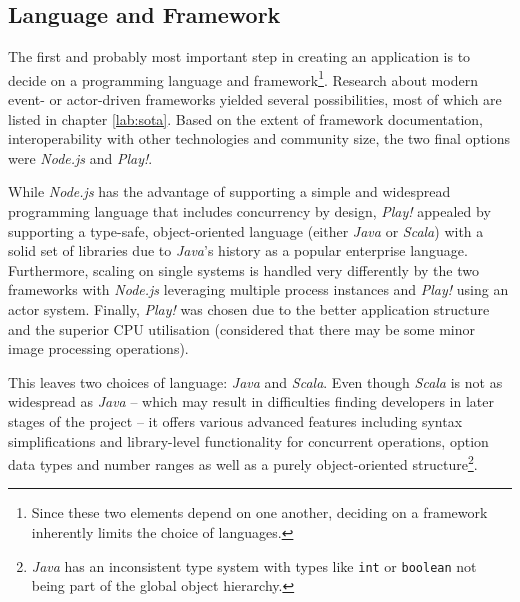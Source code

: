 \subsection{Language and Framework}
\label{lab:lang}
The first and probably most important step in creating an application is to decide on a programming language and framework\footnote{Since these two elements depend on one another, deciding on a framework inherently limits the choice of languages.}. Research about modern event- or actor-driven frameworks yielded several possibilities, most of which are listed in chapter \ref{lab:sota}. Based on the extent of framework documentation, interoperability with other technologies and community size, the two final options were \textit{Node.js} and \textit{Play!}. 

While \textit{Node.js} has the advantage of supporting a simple and widespread programming language that includes concurrency by design, \textit{Play!} appealed by supporting a type-safe, object-oriented language (either \textit{Java} or \textit{Scala}) with a solid set of libraries due to \textit{Java}'s history as a popular enterprise language. Furthermore, scaling on single systems is handled very differently by the two frameworks with \textit{Node.js} leveraging multiple process instances and \textit{Play!} using an actor system. Finally, \textit{Play!} was chosen due to the better application structure and the superior CPU utilisation (considered that there may be some minor image processing operations).

This leaves two choices of language: \textit{Java} and \textit{Scala}. Even though \textit{Scala} is not as widespread as \textit{Java} -- which may result in difficulties finding developers in later stages of the project -- it offers various advanced features including syntax simplifications and library-level functionality for concurrent operations, option data types and number ranges as well as a purely object-oriented structure\footnote{\textit{Java} has an inconsistent type system with types like \texttt{int} or \texttt{boolean} not being part of the global object hierarchy.}. 

